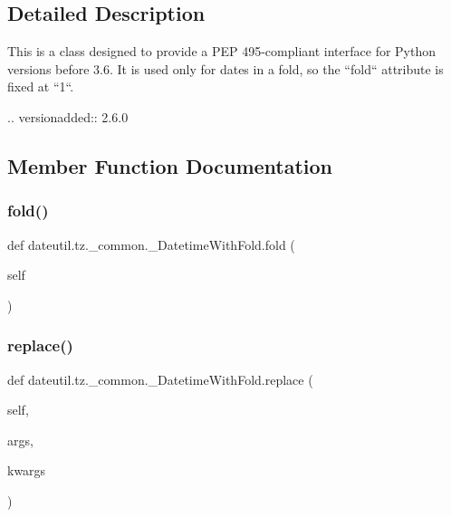 \subsection{Detailed Description}
\begin{DoxyVerb}This is a class designed to provide a PEP 495-compliant interface for
Python versions before 3.6. It is used only for dates in a fold, so
the ``fold`` attribute is fixed at ``1``.

.. versionadded:: 2.6.0
\end{DoxyVerb}
 

\subsection{Member Function Documentation}
\mbox{\label{classdateutil_1_1tz_1_1__common_1_1__DatetimeWithFold_a2b99810ebbdb187d83b95be6c69bcbf5}} 
\subsubsection{\texorpdfstring{fold()}{fold()}}
{\footnotesize\ttfamily def dateutil.\+tz.\+\_\+common.\+\_\+\+Datetime\+With\+Fold.\+fold (\begin{DoxyParamCaption}\item[{}]{self }\end{DoxyParamCaption})}

\mbox{\label{classdateutil_1_1tz_1_1__common_1_1__DatetimeWithFold_acf169cf4f46f72cf2a112ccb3e9c4bc1}} 
\subsubsection{\texorpdfstring{replace()}{replace()}}
{\footnotesize\ttfamily def dateutil.\+tz.\+\_\+common.\+\_\+\+Datetime\+With\+Fold.\+replace (\begin{DoxyParamCaption}\item[{}]{self,  }\item[{}]{args,  }\item[{}]{kwargs }\end{DoxyParamCaption})}

